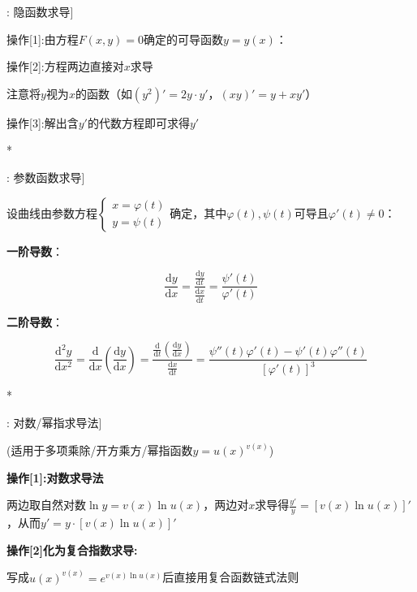 \documentclass[11pt,a4paper,UTF8]{ctexart}
\begin{document}
\begin{thmbox}[原理[8]: 隐函数求导]

操作[1]:由方程$F(x, y) = 0$确定的可导函数$y = y(x)$：

操作[2]:方程两边直接对$x$求导

  注意将$y$视为$x$的函数（如$(y^2)' = 2y \cdot y'$，$(xy)' = y + x y'$）

操作[3]:解出含$y'$的代数方程即可求得$y'$

\textit{}*

\end{thmbox}
\begin{thmbox}[原理[9]: 参数函数求导]

设曲线由参数方程$\begin{cases} x = \varphi(t) \\ y = \psi(t) \end{cases}$确定，其中$\varphi(t), \psi(t)$可导且$\varphi'(t) \neq 0$：

\textbf{一阶导数}：

\end{thmbox}

\begin{equation*}
\frac{\mathrm{d}y}{\mathrm{d}x} = \frac{\frac{\mathrm{d}y}{\mathrm{d}t}}{\frac{\mathrm{d}x}{\mathrm{d}t}} = \frac{\psi'(t)}{\varphi'(t)}
\end{equation*}

\textbf{二阶导数}：


\begin{equation*}
\frac{\mathrm{d}^2y}{\mathrm{d}x^2} = \frac{\mathrm{d}}{\mathrm{d}x}\left(\frac{\mathrm{d}y}{\mathrm{d}x}\right) = \frac{\frac{\mathrm{d}}{\mathrm{d}t}\left(\frac{\mathrm{d}y}{\mathrm{d}x}\right)}{\frac{\mathrm{d}x}{\mathrm{d}t}} = \frac{\psi''(t)\varphi'(t) - \psi'(t)\varphi''(t)}{[\varphi'(t)]^3}
\end{equation*}

\textit{}*

\begin{thmbox}[原理[10]: 对数/幂指求导法]

(适用于多项乘除/开方乘方/幂指函数$y = u(x)^{v(x)}$)

\textbf{操作[1]:对数求导法}

两边取自然对数$\ln y = v(x)\ln u(x)$，两边对$x$求导得$\frac{y'}{y} = [v(x)\ln u(x)]'$，从而$y' = y \cdot [v(x)\ln u(x)]'$

\textbf{操作[2]化为复合指数求导:}

写成$u(x)^{v(x)} = e^{v(x)\ln u(x)}$后直接用复合函数链式法则

\end{thmbox}
\end{document}
